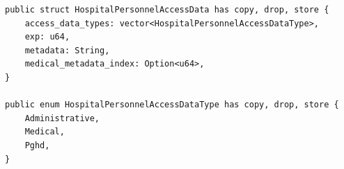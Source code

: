 \begin{lstlisting}[caption={Struktur data capability akses personel fasyankes}, label={lst:hospital-personnel-access-data-struct}, float=htb]
public struct HospitalPersonnelAccessData has copy, drop, store {
    access_data_types: vector<HospitalPersonnelAccessDataType>,
    exp: u64,
    metadata: String,
    medical_metadata_index: Option<u64>,
}

public enum HospitalPersonnelAccessDataType has copy, drop, store {
    Administrative,
    Medical,
    Pghd,
}
\end{lstlisting}
